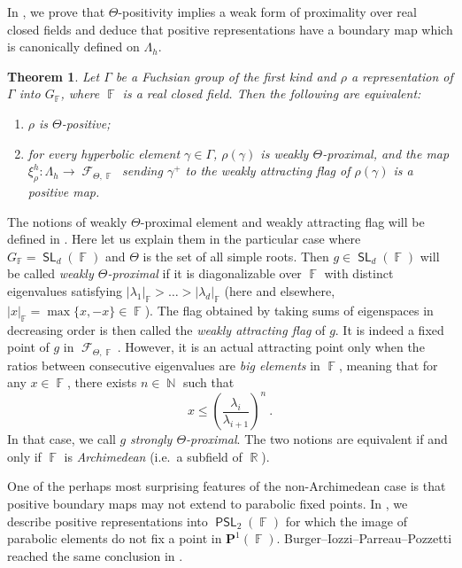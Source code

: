 \documentclass{amsart}
\theoremstyle{plain}
\newtheorem{ThmIntro}{Theorem}
\theoremstyle{definition}
\DeclareMathOperator{\SL}{\mathsf{SL}}
\DeclareMathOperator{\PSL}{\mathsf{PSL}}
\DeclareMathOperator{\N}{{\mathbb{N}}}
\DeclareMathOperator{\Fc}{\mathcal{F}}
\DeclareMathOperator{\Fb}{{\mathbb{F}}}
\DeclareMathOperator{\Rb}{{\mathbb{R}}}
\newcommand*\from{\colon}
\newcommand{\1}{\mathbf{1}}
\begin{document}
In , we prove that $\Theta$-positivity implies a weak form of proximality over real closed fields and deduce that positive representations have a boundary map which is canonically defined on $\Lambda_h$.

\begin{ThmIntro} \label{thm-intro: weak proximality}
Let $\Gamma$ be a Fuchsian group of the first kind and $\rho$ a representation of $\Gamma$ into $G_{\Fb}$, where $\Fb$ is a real closed field. Then the following are equivalent:
\begin{enumerate}
    \item
    \label{thm-intro: weak proximality: item positive}
    $\rho$ is $\Theta$-positive;
    \item 
    \label{thm-intro: weak proximality: item positive on fixed points}
    for every hyperbolic element $\gamma \in \Gamma$, $\rho(\gamma)$ is \emph{weakly $\Theta$-proximal}, and the map $\xi^h_\rho \from \Lambda_h \to \Fc_{\Theta,\Fb}$ sending $\gamma^+$ to the weakly attracting flag of $\rho(\gamma)$ is a positive map.
\end{enumerate}
\end{ThmIntro}

The notions of weakly $\Theta$-proximal element and weakly attracting flag will be defined in .
Here let us explain them in the particular case where $G_{\Fb}= \SL_d(\Fb)$ and $\Theta$ is the set of all simple roots. Then $g \in \SL_d(\Fb)$ will be called \emph{weakly $\Theta$-proximal} if it is diagonalizable over $\Fb$ with distinct eigenvalues satisfying $\vert \lambda_1 \vert_{\Fb} > \ldots > \vert \lambda_d\vert_{\Fb} $ (here and elsewhere, $\vert x\vert_{\Fb} = \max\{x,-x\}\in \Fb$). The flag obtained by taking sums of eigenspaces in decreasing order is then called the \emph{weakly attracting flag} of $g$. It is indeed a fixed point of $g$ in $\Fc_{\Theta, \Fb}$. However, it is an actual attracting point only when the ratios between consecutive eigenvalues are \emph{big elements} in $\Fb$, meaning that for any $x\in \Fb$, there exists $n\in \N$ such that
\[x \leq \left(\frac{\lambda_i}{\lambda_{i+1}}\right)^n~.\]
In that case, we call $g$ \emph{strongly $\Theta$-proximal}. The two notions are equivalent if and only if $\Fb$ is \emph{Archimedean} (i.e.\ a subfield of $\Rb$).

One of the perhaps most surprising features of the non-Archimedean case is that positive boundary maps may not extend to parabolic fixed points. In , we describe positive representations into $\PSL_2(\Fb)$ for which the image of parabolic elements do not fix a point in $\mathbf P^1(\Fb)$. Burger--Iozzi--Parreau--Pozzetti reached the same conclusion in \cite{BIPP_RSCMaximalRepr}. 
\end{document}
